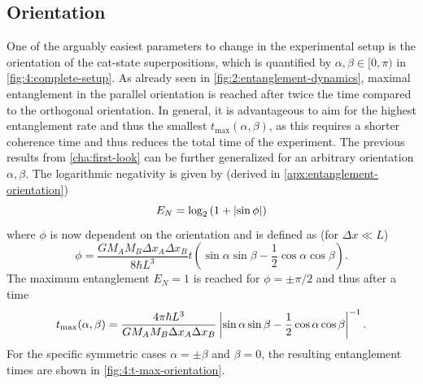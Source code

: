 \subsection{Orientation}
One of the arguably easiest parameters to change in the experimental setup is the orientation of the cat-state superpositions, which is quantified by $\alpha, \beta \in [0, \pi)$ in \cref{fig:4:complete-setup}.
As already seen in \cref{fig:2:entanglement-dynamics}, maximal entanglement in the parallel orientation is reached after twice the time compared to the orthogonal orientation.
In general, it is advantageous to aim for the highest entanglement rate and thus the smallest $t_\mathrm{max}(\alpha, \beta)$, as this requires a shorter coherence time and thus reduces the total time of the experiment.
The previous results from \cref{cha:first-look} can be further generalized for an arbitrary orientation $\alpha, \beta$. The logarithmic negativity is given by (derived in \cref{apx:entanglement-orientation})
\begin{equation}
  E_N = \log_2\left(1+\left\lvert\sin\phi\right\rvert\right)
\end{equation}
where $\phi$ is now dependent on the orientation and is defined as (for $\Delta x \ll L$)
\begin{equation}\label{eq:4:phi-orientation}
  \phi = \frac{G M_A M_B \Delta x_A \Delta x_B}{8\hbar L^3} t \left(\sin\alpha\sin\beta-\frac{1}{2}\cos\alpha\cos\beta\right) .
\end{equation}
The maximum entanglement $E_N=1$ is reached for $\phi = \pm \pi/2$ and thus after a time
\begin{equation}\label{eq:4:t-max}
  t_\mathrm{max}(\alpha,\beta) = \frac{4\pi \hbar L^3}{G M_A M_B \Delta x_A \Delta x_B}\left\lvert\sin\alpha\sin\beta - \frac{1}{2}\cos\alpha\cos\beta\right\rvert^{-1}.
\end{equation}
For the specific symmetric cases $\alpha=\pm \beta$ and $\beta = 0$, the resulting entanglement times are shown in \cref{fig:4:t-max-orientation}.
